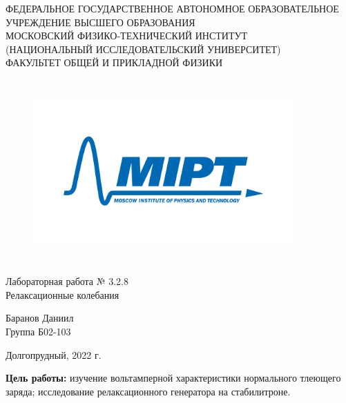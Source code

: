 \documentclass[a4paper,12pt]{article} %
\begin{document}
\begin{center}
	\footnotesize{ФЕДЕРАЛЬНОЕ ГОСУДАРСТВЕННОЕ АВТОНОМНОЕ ОБРАЗОВАТЕЛЬНОЕ 			УЧРЕЖДЕНИЕ ВЫСШЕГО ОБРАЗОВАНИЯ}\\
	\footnotesize{МОСКОВСКИЙ ФИЗИКО-ТЕХНИЧЕСКИЙ ИНСТИТУТ\\(НАЦИОНАЛЬНЫЙ 			ИССЛЕДОВАТЕЛЬСКИЙ УНИВЕРСИТЕТ)}\\
	\footnotesize{ФАКУЛЬТЕТ ОБЩЕЙ И ПРИКЛАДНОЙ ФИЗИКИ\\}
	\hfill \break
	\hfill \break
	\hfill \break
	\hfill \break
\end{center}


\begin{figure}[h]
    \centering
    \includegraphics*[width=10cm,height=7cm,keepaspectratio]{mipt_eng_text_png.png}
    \label{fig:my_label}
\end{figure}


\begin{center}   
    \hfill \break
	\hfill \break
	\hfill \break
	\large{Лабораторная работа № 3.2.8\\ \hfill \break\Large{Релаксационные колебания}}\\
	\hfill \break
	\hfill \break
	\hfill \break
	\hfill \break
	\begin{flushright}
		Баранов Даниил\\
		Группа Б02-103
	\end{flushright}
	\hfill \break
	\hfill \break
	\hfill \break
\end{center}
\hfill \break
\hfill \break
\hfill \break
\hfill \break
\begin{center}
	Долгопрудный, 2022 г.
\end{center}
\thispagestyle{empty}

\newpage

\textbf{Цель работы:} изучение вольтамперной характеристики нормального тлеющего заряда; исследование релаксационного генератора на стабилитроне.
\end{document}
